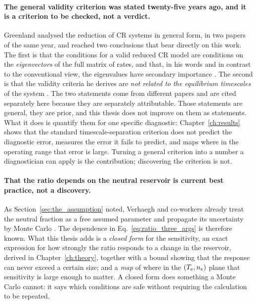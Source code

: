 \paragraph{The general validity criterion was stated twenty-five years ago, and
it is a criterion to be checked, not a verdict.} Greenland analysed the reduction of CR systems in general
form, in two papers of the same year, and reached two conclusions that bear
directly on this work. The first is that the conditions for a valid reduced CR
model are conditions on the \emph{eigenvectors} of the full matrix of rates, and
that, in his words and in contrast to the conventional view, the
eigenvalues have secondary importance \cite{Greenland2001a}. The second is that
the validity criteria he derives are \emph{not related to the equilibrium
timescales} of the system \cite{Greenland2001b}. The two statements come from
different papers and are cited separately here because they are separately
attributable. Those statements are general, they are prior, and this thesis
does not improve on them as statements. What it does is quantify them for one
specific diagnostic: Chapter~\ref{ch:results} shows that the standard
timescale-separation criterion does not predict the diagnostic error, measures
the error it fails to predict, and maps where in the operating range that error
is large. Turning a general criterion into a number a diagnostician can apply is
the contribution; discovering the criterion is not.

\paragraph{That the ratio depends on the neutral reservoir is current best
practice, not a discovery.} As Section~\ref{sec:the_assumption} noted, Verhaegh
and co-workers already treat the neutral fraction as a free assumed parameter and
propagate its uncertainty by Monte Carlo \cite{Verhaegh2019}. The dependence in
Eq.~\eqref{eq:ratio_three_args} is therefore known. What this thesis adds is a
\emph{closed form} for the sensitivity, an exact expression for how strongly
the ratio responds to a change in the reservoir, derived in
Chapter~\ref{ch:theory}, together with a bound showing that the response can
never exceed a certain size; and a \emph{map} of where in the $(T_e,n_e)$
plane that sensitivity is large enough to matter. A closed form does something a
Monte Carlo cannot: it says which conditions are safe without requiring the
calculation to be repeated.

